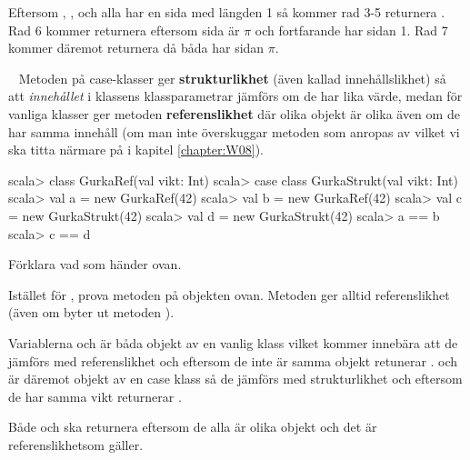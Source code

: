Eftersom , ,  och  alla har en sida med längden 1 så kommer rad 3-5 returnera . Rad 6 kommer returnera  eftersom  sida är $\pi$ och  fortfarande har sidan 1. Rad 7 kommer däremot returnera  då båda har sidan $\pi$.


\QUESTEND







\QUESTBEGIN

\Task  \what~  Metoden \code{==} på case-klasser ger \textbf{strukturlikhet} (även kallad innehållslikhet) så att \emph{innehållet} i klassens klassparametrar jämförs om de har lika värde, medan för vanliga klasser ger metoden \code{==} \textbf{referenslikhet} där olika objekt är olika även om de har samma innehåll (om man inte överskuggar metoden  som anropas av \code{==} vilket vi ska titta närmare på i kapitel \ref{chapter:W08}).

\begin{REPL}
scala> class GurkaRef(val vikt: Int)
scala> case class GurkaStrukt(val vikt: Int)
scala> val a = new GurkaRef(42)
scala> val b = new GurkaRef(42)
scala> val c = new GurkaStrukt(42)
scala> val d = new GurkaStrukt(42)
scala> a == b
scala> c == d
\end{REPL}

\Subtask Förklara vad som händer ovan.

\Subtask Istället för \code{==}, prova metoden  på objekten ovan. Metoden  ger alltid referenslikhet (även om byter ut metoden ).

\SOLUTION


\TaskSolved \what


\SubtaskSolved  Variablerna  och  är båda objekt av en vanlig klass vilket kommer innebära att de jämförs med referenslikhet och eftersom de inte är samma objekt retunerar \code{==} .  och  är däremot objekt av en case klass så de jämförs med strukturlikhet och eftersom de har samma vikt returnerar \code{==} .

\SubtaskSolved  Både  och  ska returnera  eftersom de alla är olika objekt och det är referenslikhetsom gäller.


\QUESTEND




